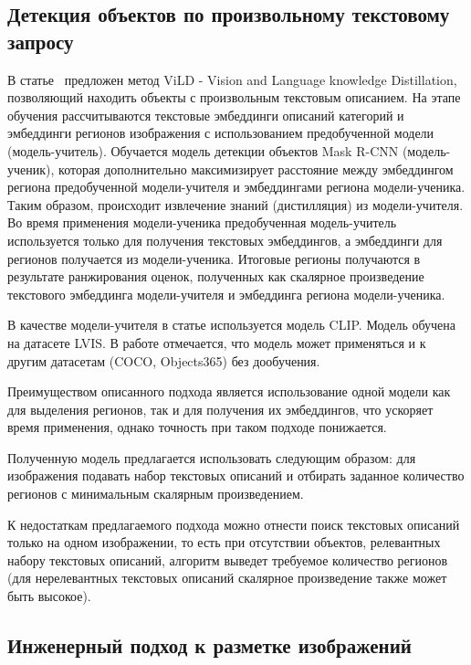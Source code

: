 \documentclass[a4paper,14pt]{article}
\begin{document}
	\subsection{Детекция объектов по произвольному текстовому запросу}
	
	В статье~\cite{ViLD} предложен метод ViLD - Vision and Language knowledge Distillation, позволяющий находить объекты с произвольным текстовым описанием. 
	На этапе обучения рассчитываются текстовые эмбеддинги описаний категорий и эмбеддинги регионов изображения с использованием предобученной модели (модель-учитель). 
	Обучается модель детекции объектов Mask R-CNN (модель-ученик), которая дополнительно максимизирует расстояние между эмбеддингом региона предобученной модели-учителя и эмбеддингами региона модели-ученика. 
	Таким образом, происходит извлечение знаний (дистилляция) из модели-учителя. 
	Во время применения модели-ученика предобученная модель-учитель используется только для получения текстовых эмбеддингов, а эмбеддинги для регионов получается из модели-ученика. 
	Итоговые регионы получаются в результате ранжирования оценок, полученных как скалярное произведение текстового эмбеддинга модели-учителя и эмбеддинга региона модели-ученика.
	 
	В качестве модели-учителя в статье используется модель CLIP. 
	Модель обучена на датасете LVIS. В работе отмечается, что модель может применяться и к другим датасетам (COCO, Objects365) без дообучения.
	
	Преимуществом описанного подхода является использование одной модели как для выделения регионов, так и для получения их эмбеддингов, что ускоряет время применения, однако точность при таком подходе понижается.
	
	Полученную модель предлагается использовать следующим образом: для изображения подавать набор текстовых описаний и отбирать заданное количество регионов с минимальным скалярным произведением. 
	
	К недостаткам предлагаемого подхода можно отнести поиск текстовых описаний только на одном изображении, то есть при отсутствии объектов, релевантных набору текстовых описаний, алгоритм  выведет требуемое количество регионов (для нерелевантных текстовых описаний скалярное произведение также может быть высокое).
	
	\subsection{Инженерный подход к разметке изображений}
	
\end{document}
